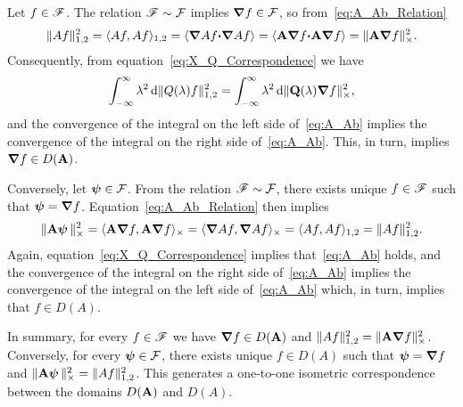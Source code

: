 \documentclass[amsa]{ipart}
\begin{document}
Let $f\in\mathscr{F}$. The
relation $\mathscr{F}\sim\mathcal{F}$ implies $\mbox{\boldmath${\nabla}$} f\in\mathcal{F}$, so
from~\eqref{eq:A_Ab_Relation} 
%
\begin{align}\label{eq:Norm_A_Ab}
  \|Af\|_{1,2}^2=\langle Af,Af\rangle_{1,2}
        =\langle\bnabla  A f\bcdot\bnabla  A f\rangle
        =\langle\Ab\bnabla f\bcdot\Ab\bnabla f\rangle
        =\|\Ab\bnabla f\|_\times^2.
\end{align}
%
Consequently, from equation~\eqref{eq:X_Q_Correspondence} we have 
%
\begin{align}\label{eq:A_Ab}
  \int_{-\infty}^\infty\lambda^2\,\d\|Q(\lambda)f\|_{1,2}^2=\int_{-\infty}^\infty\lambda^2\,\d\|\Qb(\lambda)\bnabla f\|_\times^2,
\end{align}
%
and the convergence of the integral on the left side
of~\eqref{eq:A_Ab} implies the convergence of the integral on the
right side of~\eqref{eq:A_Ab}. This, in turn, implies $\mbox{\boldmath${\nabla}$} f\in
D(\mathbf{A})$.



Conversely, let $\boldsymbol{\psi}\in\mathcal{F}$. From the
relation $\mathscr{F}\sim\mathcal{F}$, there exists unique $f\in\mathscr{F}$ such that
$\boldsymbol{\psi}=\mbox{\boldmath${\nabla}$} f$. Equation~\eqref{eq:A_Ab_Relation} then
implies 
%
\begin{align}
  \|\Ab\vecpsi\,\|_\times^2=\langle\Ab\bnabla f,\Ab\bnabla f\rangle_\times
         =\langle\bnabla  A f,\bnabla  A f\rangle_\times
         =\langle Af,Af\rangle_{1,2}
         =\|Af\|_{1,2}^2.
\end{align}
%
Again, equation~\eqref{eq:X_Q_Correspondence} implies
that~\eqref{eq:A_Ab} holds, and the convergence of the integral on the
right side of~\eqref{eq:A_Ab} implies the convergence of the integral
on the left side of~\eqref{eq:A_Ab} which, in turn, implies that 
$f\in D(A)$.


In summary, for every $f\in\mathscr{F}$ we have $\mbox{\boldmath${\nabla}$} f\in D(\mathbf{A})$ and
$\|Af\|_{1,2}^2=\|\mathbf{A}\mbox{\boldmath${\nabla}$} f\|_\times^2$. Conversely, for every $\boldsymbol{\psi}\in\mathcal{F}$,
there exists unique $f\in D(A)$ such that $\boldsymbol{\psi}=\mbox{\boldmath${\nabla}$} f$ and
$\|\mathbf{A}\boldsymbol{\psi}\,\|_\times^2=\|Af\|_{1,2}^2$. This generates a one-to-one isometric
correspondence between the domains $D(\mathbf{A})$ and $D(A)$.       
\end{document}
